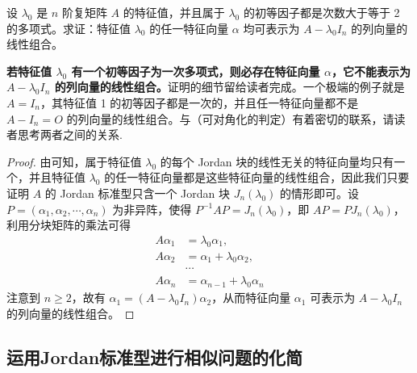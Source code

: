 \documentclass[../../main.tex]{subfiles}
\begin{document}
\begin{proposition}\label{proposition:列向量的线性组合}
设 $\lambda_0$ 是 $n$ 阶复矩阵 $A$ 的特征值，并且属于 $\lambda_0$ 的初等因子都是次数大于等于 2 的多项式。求证：特征值 $\lambda_0$ 的任一特征向量 $\alpha$ 均可表示为 $A - \lambda_0I_n$ 的列向量的线性组合。
\end{proposition}
\begin{remark}
\textbf{若特征值 $\lambda_0$ 有一个初等因子为一次多项式，则必存在特征向量 $\alpha$，它不能表示为 $A - \lambda_0I_n$ 的列向量的线性组合。}证明的细节留给读者完成。一个极端的例子就是 $A = I_n$，其特征值 1 的初等因子都是一次的，并且任一特征向量都不是 $A - I_n = O$ 的列向量的线性组合。与（可对角化的判定）有着密切的联系，请读者思考两者之间的关系.
\end{remark}
\begin{proof}
由可知，属于特征值 $\lambda_0$ 的每个 Jordan 块的线性无关的特征向量均只有一个，并且特征值 $\lambda_0$ 的任一特征向量都是这些特征向量的线性组合，因此我们只要证明 $A$ 的 Jordan 标准型只含一个 Jordan 块 $J_n(\lambda_0)$ 的情形即可。设 $P = (\alpha_1,\alpha_2,\cdots,\alpha_n)$ 为非异阵，使得 $P^{-1}AP = J_n(\lambda_0)$，即 $AP = PJ_n(\lambda_0)$，利用分块矩阵的乘法可得
\begin{align*}
A\alpha_1 &= \lambda_0\alpha_1,\\
A\alpha_2 &= \alpha_1 + \lambda_0\alpha_2,\\
&\cdots\\
A\alpha_n &= \alpha_{n - 1} + \lambda_0\alpha_n
\end{align*}
注意到 $n \geq 2$，故有 $\alpha_1 = (A - \lambda_0I_n)\alpha_2$，从而特征向量 $\alpha_1$ 可表示为 $A - \lambda_0I_n$ 的列向量的线性组合。
\end{proof}



\subsection{运用Jordan标准型进行相似问题的化简}
\end{document}
